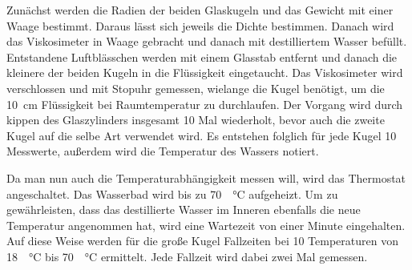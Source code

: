 Zunächst werden die Radien der beiden Glaskugeln und das Gewicht mit einer 
Waage bestimmt. Daraus lässt sich jeweils die Dichte bestimmen. 
Danach wird das Viskosimeter in Waage gebracht und danach mit destilliertem Wasser 
befüllt. Entstandene Luftblässchen werden mit einem Glasstab entfernt und 
danach die kleinere der beiden Kugeln in die Flüssigkeit eingetaucht. Das 
Viskosimeter wird verschlossen und mit Stopuhr gemessen, wielange die Kugel benötigt, 
um die \SI{10}{\centi\meter} Flüssigkeit bei Raumtemperatur zu durchlaufen. 
Der Vorgang wird durch kippen des Glaszylinders insgesamt 10 Mal wiederholt, 
bevor auch die zweite Kugel auf die selbe Art verwendet wird. Es entstehen 
folglich für jede Kugel 10 Messwerte, außerdem wird die Temperatur des Wassers
notiert. 

Da man nun auch die Temperaturabhängigkeit messen will, wird das Thermostat
angeschaltet. Das Wasserbad wird bis zu \SI{70}{\grad\celsius} aufgeheizt. 
Um zu gewährleisten, dass das destillierte Wasser im Inneren ebenfalls 
die neue Temperatur angenommen hat, wird eine Wartezeit von einer Minute 
eingehalten. Auf diese Weise werden für die große Kugel Fallzeiten bei 10 
Temperaturen von \SI{18}{\grad\celsius} bis \SI{70}{\grad\celsius} ermittelt.
Jede Fallzeit wird dabei zwei Mal gemessen. 


\label{sec:Durchführung}
